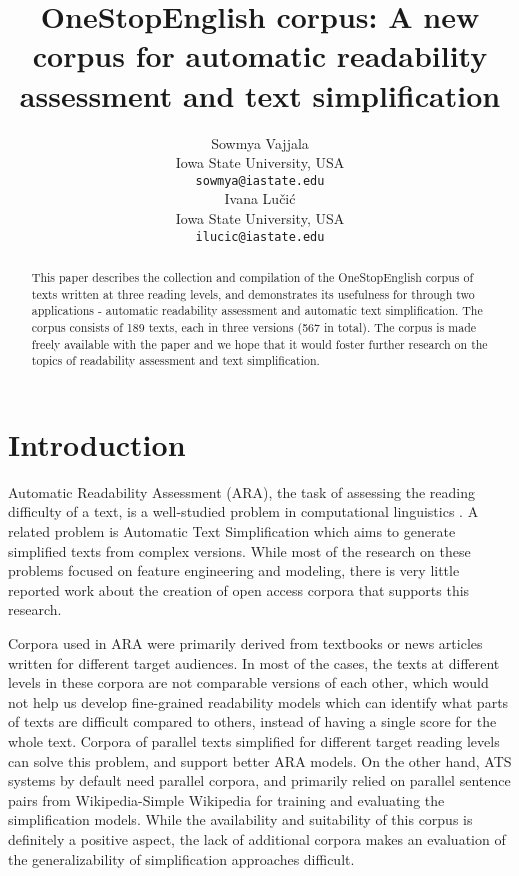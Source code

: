 \documentclass[11pt,a4paper]{article}
\title{OneStopEnglish corpus: A new corpus for automatic readability assessment and text simplification}
\author{Sowmya Vajjala \\
 Iowa State University, USA \\
  {\tt sowmya@iastate.edu} \\
  \And
  Ivana Lu\v{c}i\'c  \\
 Iowa State University, USA \\
  {\tt ilucic@iastate.edu} \\
  }
\date{}
\begin{document}
\maketitle
\begin{abstract}
This paper describes the collection and compilation of the OneStopEnglish corpus of texts written at three reading levels, and demonstrates its usefulness for through two applications - automatic readability assessment and automatic text simplification. The corpus consists of 189 texts, each in three versions (567 in total). The corpus is made freely available with the paper and we hope that it would foster further research on the topics of readability assessment and text simplification. 
\end{abstract}

\section{Introduction}
\label{sec:intro}
Automatic Readability Assessment (ARA), the task of assessing the reading difficulty of a text, is a well-studied problem in computational linguistics \cite[cf.][]{Collins-Thompson-14}. A related problem is Automatic Text Simplification \cite[cf.][]{Siddharthan-14} which aims to generate simplified texts from complex versions. While most of the research on these problems focused on feature engineering and modeling, there is very little reported work about the creation of open access corpora that supports this research. 

Corpora used in ARA were primarily derived from textbooks or news articles written for different target audiences. In most of the cases, the texts at different levels in these corpora are not comparable versions of each other, which would not help us develop fine-grained readability models which can identify what parts of texts are difficult compared to others, instead of having a single score for the whole text. Corpora of parallel texts simplified for different target reading levels can solve this problem, and support better ARA models. On the other hand, ATS systems by default need parallel corpora, and primarily relied on parallel sentence pairs from Wikipedia-Simple Wikipedia for training and evaluating the simplification models. While the availability and suitability of this corpus is definitely a positive aspect, the lack of additional corpora makes an evaluation of the generalizability of simplification approaches difficult. 
\end{document}
